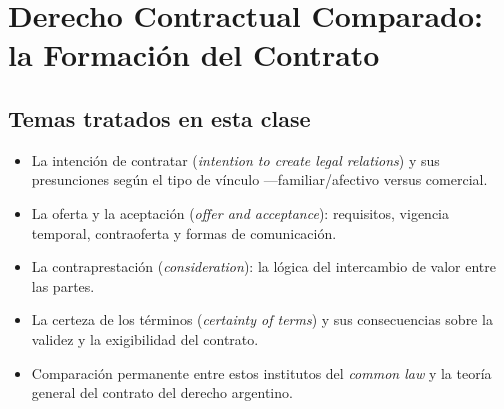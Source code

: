 \documentclass[12pt,oneside]{book}
\begin{document}
\tableofcontents

\chapter[Formación del contrato en el \textit{common law}]{Derecho Contractual Comparado: la Formación del Contrato}

\section*{Temas tratados en esta clase}

\begin{itemize}
    \item La intención de contratar (\textit{intention to create legal relations}) y sus presunciones según el tipo de vínculo —familiar/afectivo versus comercial.
    \item La oferta y la aceptación (\textit{offer and acceptance}): requisitos, vigencia temporal, contraoferta y formas de comunicación.
    \item La contraprestación (\textit{consideration}): la lógica del intercambio de valor entre las partes.
    \item La certeza de los términos (\textit{certainty of terms}) y sus consecuencias sobre la validez y la exigibilidad del contrato.
    \item Comparación permanente entre estos institutos del \textit{common law} y la teoría general del contrato del derecho argentino.
\end{itemize}
\end{document}
